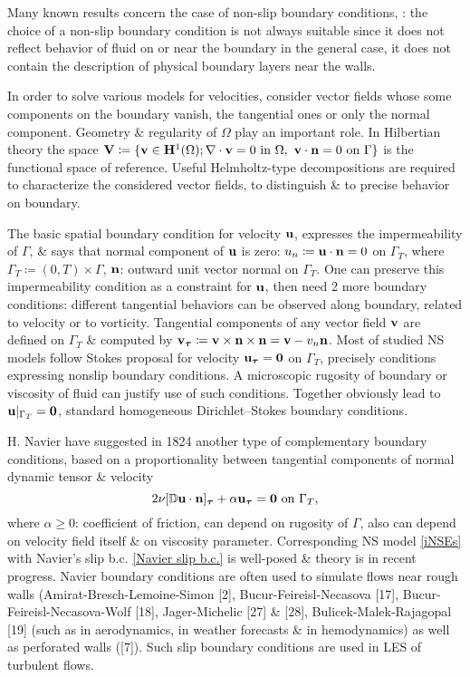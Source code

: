 \documentclass{article}
\begin{document}
\begin{enumerate}
\begin{itemize}
		Many known results concern the case of non-slip boundary conditions, \cite{Serrin1959}: the choice of a non-slip boundary condition is not always suitable since it does not reflect behavior of fluid on or near the boundary in the general case, it does not contain the description of physical boundary layers near the walls.
		
		In order to solve various models for velocities, consider vector fields whose some components on the boundary vanish, the tangential ones or only the normal component. Geometry \& regularity of $\Omega$ play an important role. In Hilbertian theory the space ${\bf V}\coloneqq\{{\bf v}\in{\bf H}^1(\Omega);\nabla\cdot{\bf v} = 0\mbox{ in }\Omega,\ {\bf v}\cdot{\bf n} = 0\mbox{ on }\Gamma\}$ is the functional space of reference. Useful Helmholtz-type decompositions are required to characterize the considered vector fields, to distinguish \& to precise behavior on boundary.
		
		The basic spatial boundary condition for velocity ${\bf u}$, expresses the impermeability of $\Gamma$, \& says that normal component of ${\bf u}$ is zero: $u_n\coloneqq{\bf u}\cdot{\bf n} = 0$ on $\Gamma_T$, where $\Gamma_T\coloneqq(0,T)\times\Gamma$, ${\bf n}$: outward unit vector normal on $\Gamma_T$. One can preserve this impermeability condition as a constraint for ${\bf u}$, then need 2 more boundary conditions: different tangential behaviors can be observed along boundary, related to velocity or to vorticity. Tangential components of any vector field ${\bf v}$ are defined on $\Gamma_T$ \& computed by ${\bf v}_{\boldsymbol{\tau}}\coloneqq{\bf v}\times{\bf n}\times{\bf n} = {\bf v} - v_n{\bf n}$. Most of studied NS models follow Stokes proposal for velocity ${\bf u}_{\boldsymbol{\tau}} = {\bf 0}$ on $\Gamma_T$, precisely conditions expressing nonslip boundary conditions. A microscopic rugosity of boundary or viscosity of fluid can justify use of such conditions. Together obviously lead to ${\bf u}|_{\Gamma_T} = {\bf 0}$, standard homogeneous Dirichlet--Stokes boundary conditions.
		
		H. Navier \cite{Navier1827} have suggested in 1824 another type of complementary boundary conditions, based on a proportionality between tangential components of normal dynamic tensor \& velocity
		\begin{equation}
			\label{Navier slip b.c.}
			2\nu[\mathbb{D}{\bf u}\cdot{\bf n}]_{\boldsymbol{\tau}} + \alpha{\bf u}_{\boldsymbol{\tau}} = {\bf 0}\mbox{ on }\Gamma_T,
		\end{equation}
		where $\alpha\ge0$: coefficient of friction, can depend on rugosity of $\Gamma$, also can depend on velocity field itself \& on viscosity parameter. Corresponding NS model \eqref{iNSEs} with Navier's slip b.c. \eqref{Navier slip b.c.} is well-posed \& theory is in recent progress. Navier boundary conditions are often used to simulate flows near rough walls (Amirat-Bresch-Lemoine-Simon [2], Bucur-Feireisl-Necasova [17], Bucur-Feireisl-Necasova-Wolf [18], Jager-Michelic [27] \& [28], Bulicek-Malek-Rajagopal [19] (such as in aerodynamics, in weather forecasts \& in hemodynamics) as well as perforated walls ([7]). Such slip boundary conditions are used in LES of turbulent flows.
		

\end{itemize}
\end{enumerate}
\end{document}
